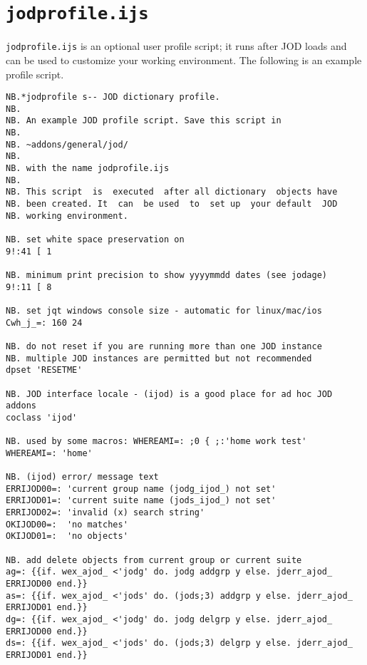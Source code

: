    \newpage
   \section{\texttt{jodprofile.ijs}}\label{ap:jodprofile}
   
\verb|jodprofile.ijs| is an optional user profile script; it runs after
JOD loads and can be used to customize your working environment.  The following is an example
profile script. 


\begin{lstlisting}[frame=single,framerule=0pt,basicstyle=\ttfamily\footnotesize]
NB.*jodprofile s-- JOD dictionary profile.
NB.
NB. An example JOD profile script. Save this script in
NB.
NB. ~addons/general/jod/
NB.
NB. with the name jodprofile.ijs
NB.
NB. This script  is  executed  after all dictionary  objects have
NB. been created. It  can  be used  to  set up  your default  JOD
NB. working environment.

NB. set white space preservation on
9!:41 [ 1

NB. minimum print precision to show yyyymmdd dates (see jodage)
9!:11 [ 8

NB. set jqt windows console size - automatic for linux/mac/ios
Cwh_j_=: 160 24

NB. do not reset if you are running more than one JOD instance
NB. multiple JOD instances are permitted but not recommended
dpset 'RESETME'

NB. JOD interface locale - (ijod) is a good place for ad hoc JOD addons
coclass 'ijod'

NB. used by some macros: WHEREAMI=: ;0 { ;:'home work test'
WHEREAMI=: 'home'

NB. (ijod) error/ message text
ERRIJOD00=: 'current group name (jodg_ijod_) not set'
ERRIJOD01=: 'current suite name (jods_ijod_) not set'
ERRIJOD02=: 'invalid (x) search string'
OKIJOD00=:  'no matches'
OKIJOD01=:  'no objects'

NB. add delete objects from current group or current suite
ag=: {{if. wex_ajod_ <'jodg' do. jodg addgrp y else. jderr_ajod_ ERRIJOD00 end.}}
as=: {{if. wex_ajod_ <'jods' do. (jods;3) addgrp y else. jderr_ajod_ ERRIJOD01 end.}}
dg=: {{if. wex_ajod_ <'jodg' do. jodg delgrp y else. jderr_ajod_ ERRIJOD00 end.}}
ds=: {{if. wex_ajod_ <'jods' do. (jods;3) delgrp y else. jderr_ajod_ ERRIJOD01 end.}}
   

\end{lstlisting}
